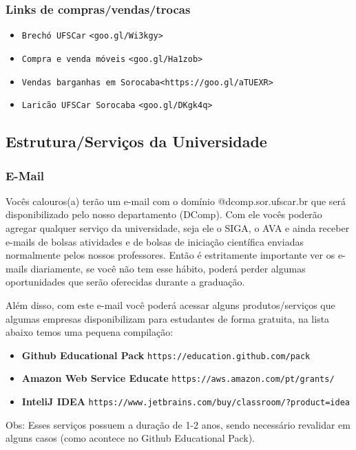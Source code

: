 \subsubsection{Links de compras/vendas/trocas}
  \begin{itemize}
    \item \texttt{Brechó UFSCar} \texttt{<goo.gl/Wi3kgy>}
    \item \texttt{Compra e venda móveis} \texttt{<goo.gl/Ha1zob>}
    \item \texttt{Vendas barganhas em Sorocaba}\texttt{<https://goo.gl/aTUEXR>}
    \item \texttt{Laricão UFSCar Sorocaba} \texttt{<goo.gl/DKgk4q>}
  \end{itemize}

\subsection{Estrutura/Serviços da Universidade}

\subsubsection{E-Mail}
Vocês calouros(a) terão um e-mail com o domínio @dcomp.sor.ufscar.br que será disponibilizado pelo nosso departamento (DComp). Com ele vocês poderão agregar qualquer serviço da universidade, seja ele o SIGA, o AVA e ainda receber e-mails de bolsas atividades e de bolsas de iniciação científica enviadas normalmente pelos nossos professores. Então é estritamente importante ver os e-mails diariamente, se você não tem esse hábito, poderá perder algumas oportunidades que serão oferecidas durante a graduação.

Além disso, com este e-mail você poderá acessar alguns produtos/serviços que algumas empresas disponibilizam para estudantes de forma gratuita, na lista abaixo temos uma pequena compilação:
\begin{itemize}
  \item \textbf{Github Educational Pack} \texttt{https://education.github.com/pack}
  \item \textbf{Amazon Web Service Educate} \texttt{https://aws.amazon.com/pt/grants/}
  \item \textbf{InteliJ IDEA} \texttt{https://www.jetbrains.com/buy/classroom/?product=idea}
\end{itemize}

Obs: Esses serviços possuem a duração de 1-2 anos, sendo necessário revalidar em alguns casos (como acontece no Github Educational Pack).

